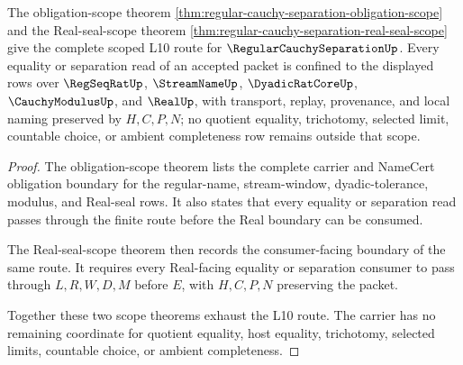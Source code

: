 
\begin{theorem}
\label{thm:regular-cauchy-separation-scoped-package}
The obligation-scope theorem \autoref{thm:regular-cauchy-separation-obligation-scope} and the Real-seal-scope theorem \autoref{thm:regular-cauchy-separation-real-seal-scope} give the complete scoped L10 route for $\RegularCauchySeparationUp$. Every equality or separation read of an accepted packet is confined to the displayed rows over $\RegSeqRatUp$, $\StreamNameUp$, $\DyadicRatCoreUp$, $\CauchyModulusUp$, and $\RealUp$, with transport, replay, provenance, and local naming preserved by $H,C,P,N$; no quotient equality, trichotomy, selected limit, countable choice, or ambient completeness row remains outside that scope.
\end{theorem}
\begin{proof}
The obligation-scope theorem lists the complete carrier and NameCert obligation boundary for the regular-name, stream-window, dyadic-tolerance, modulus, and Real-seal rows. It also states that every equality or separation read passes through the finite route before the Real boundary can be consumed.

The Real-seal-scope theorem then records the consumer-facing boundary of the same route. It requires every Real-facing equality or separation consumer to pass through $L,R,W,D,M$ before $E$, with $H,C,P,N$ preserving the packet.

Together these two scope theorems exhaust the L10 route. The carrier has no remaining coordinate for quotient equality, host equality, trichotomy, selected limits, countable choice, or ambient completeness.
\end{proof}

